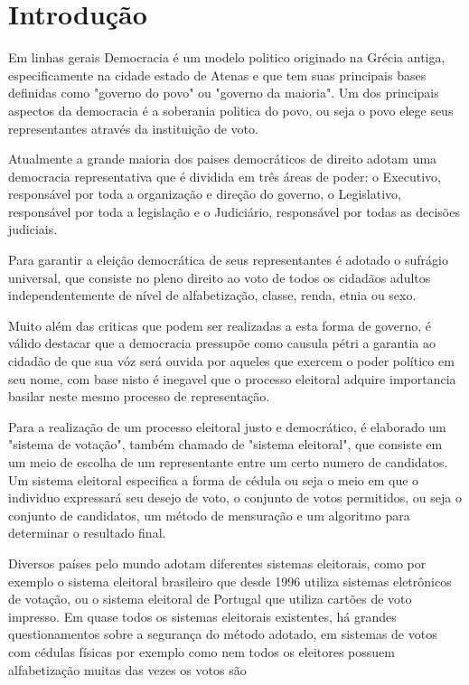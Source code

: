 \section{Introdução}
Em linhas gerais Democracia é um modelo politico originado na Grécia antiga, 
especificamente na cidade estado de Atenas e que tem suas principais bases 
definidas como "governo do povo" ou "governo da maioria". Um dos principais aspectos
da democracia é a soberania politica do povo, ou seja o povo elege seus representantes
através da instituição de voto. \par
Atualmente a grande maioria dos paises democráticos de direito adotam uma 
democracia representativa que é dividida em três áreas de poder: o Executivo, responsável por toda a organização
e direção do governo, o Legislativo, responsável por toda a legislação e o Judiciário,
responsável por todas as decisões judiciais. \par
Para garantir a eleição democrática de seus representantes é adotado o sufrágio 
universal, que consiste no pleno direito ao voto de todos os cidadãos adultos 
independentemente de nível de alfabetização, classe, renda, etnia ou sexo. \par
Muito além das criticas que podem ser realizadas a esta forma de governo, é válido
destacar que a democracia pressupõe como causula pétri a garantia ao cidadão de
que sua vóz será ouvida por aqueles que exercem o poder político em seu nome, 
com base nisto é inegavel que o processo eleitoral adquire importancia basilar
neste mesmo processo de representação. \par
Para a realização de um processo eleitoral justo e democrático, é elaborado um 
"sistema de votação", também chamado de "sistema eleitoral", que consiste em um
meio de escolha de um representante entre um certo numero de candidatos.
Um sistema eleitoral especifica a forma de cédula ou seja o meio em que o individuo
expressará seu desejo de voto, o conjunto de votos permitidos, ou seja o conjunto 
de candidatos, um método de mensuração e um algoritmo para determinar o 
resultado final. \par
Diversos países pelo mundo adotam diferentes sistemas eleitorais, como por exemplo
o sistema eleitoral brasileiro que desde 1996 utiliza sistemas eletrônicos de votação,
ou o sistema eleitoral de Portugal que utiliza cartões de voto impresso.
Em quase todos os sistemas eleitorais existentes, há grandes questionamentos sobre
a segurança do método adotado, em sistemas de votos com cédulas físicas por exemplo
como nem todos os eleitores possuem alfabetização muitas das vezes os votos são
